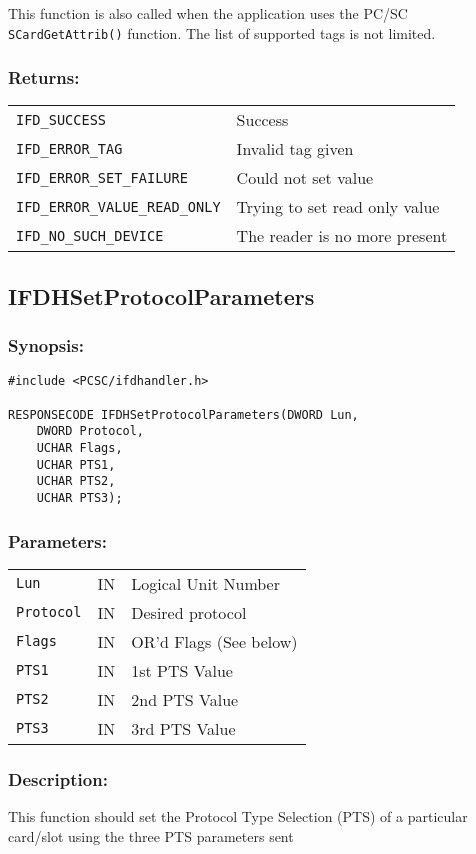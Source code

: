 \documentclass[a4paper,12pt]{article}
\newcommand{\synopsis}{\subsubsection{Synopsis:}}
\newcommand{\parameters}{\subsubsection{Parameters:}}
\newcommand{\desc}{\subsubsection{Description:}}
\newcommand{\returns}{\subsubsection{Returns:}}
\begin{document}
This function is also called when the application uses the PC/SC
\texttt{SCardGetAttrib()} function. The list of supported tags is not limited.

\returns

\begin{tabular}{ll}
\texttt{IFD\_SUCCESS} & Success\\
\texttt{IFD\_ERROR\_TAG} & Invalid tag given\\
\texttt{IFD\_ERROR\_SET\_FAILURE} & Could not set value\\
\texttt{IFD\_ERROR\_VALUE\_READ\_ONLY} & Trying to set read only value\\
\texttt{IFD\_NO\_SUCH\_DEVICE} & The reader is no more present\\
\end{tabular}


\subsection{IFDHSetProtocolParameters}

\synopsis
\begin{verbatim}
#include <PCSC/ifdhandler.h>

RESPONSECODE IFDHSetProtocolParameters(DWORD Lun,
    DWORD Protocol,
    UCHAR Flags,
    UCHAR PTS1,
    UCHAR PTS2,
    UCHAR PTS3);
\end{verbatim}

\parameters

\begin{tabular}{lll}
\texttt{Lun} & IN & Logical Unit Number\\
\texttt{Protocol} & IN & Desired protocol\\
\texttt{Flags} & IN & OR'd Flags (See below)\\
\texttt{PTS1} & IN & 1st PTS Value\\
\texttt{PTS2} & IN & 2nd PTS Value\\
\texttt{PTS3} & IN & 3rd PTS Value\\
\end{tabular}

\desc

This function should set the Protocol Type Selection (PTS) of a
particular card/slot using the three PTS parameters sent
\end{document}
